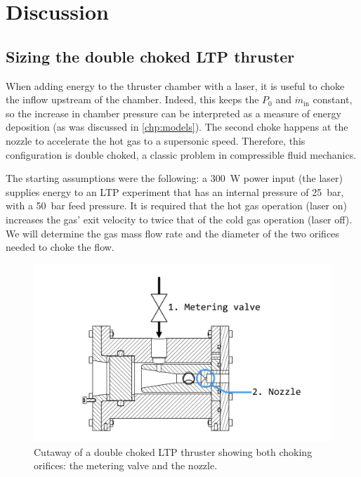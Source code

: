 \chapter{Discussion}

    \section{Sizing the double choked LTP thruster} 

            When adding energy to the thruster chamber with a laser, it is useful to choke the inflow upstream of the chamber. Indeed, this keeps the $P_0$ and $\dot{m}_\mathrm{in}$ constant, so the increase in chamber pressure can be interpreted as a measure of energy deposition (as was discussed in \autoref{chp:models}). The second choke happens at the nozzle to accelerate the hot gas to a supersonic speed. Therefore, this configuration is double choked, a classic problem in compressible fluid mechanics.
            
            The starting assumptions were the following: a \qty{300}{W} power input (the laser) supplies energy to an LTP experiment that has an internal pressure of \qty{25}{bar}, with a \qty{50}{bar} feed pressure. It is required that the hot gas operation (laser on) increases the gas' exit velocity to twice that of the cold gas operation (laser off). We will determine the gas mass flow rate and the diameter of the two orifices needed to choke the flow.

            \begin{figure}[h]
                \centering
                \includegraphics[width=0.8\linewidth]{assets/3 design/Double choked LTP thruster.pdf}
                \caption{Cutaway of a double choked LTP thruster showing both choking orifices: the metering valve and the nozzle.}
                \label{fig:double choke sizing}
            \end{figure}
            
